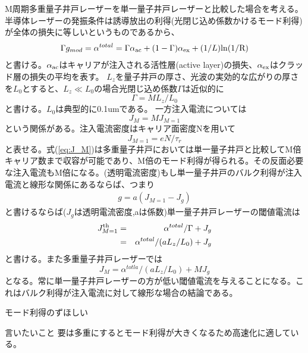 M周期多重量子井戸レーザーを単一量子井戸レーザーと比較した場合を考える。
半導体レーザーの発振条件は誘導放出の利得(光閉じ込め係数かけるモード利得)が全体の損失に等しいというものであるから、
\begin{eqnarray}
\Gamma g_{mod}=\alpha^{total}= \Gamma \alpha_{\rm{ac}} +(1-\Gamma)\alpha_{\rm{ex}}+(1/L)\rm{ln}(1/R)
\end{eqnarray}
と書ける。$\alpha_{\rm{ac}}$はキャリアが注入される活性層(active layer)の損失、$\alpha_{\rm{ex}}$はクラッド層の損失の平均を表す。
$L_{z}$を量子井戸の厚さ、光波の実効的な広がりの厚さを$L_{0}$とすると、$L_{z}\ll L_{0}$の場合光閉じ込め係数$\Gamma$は近似的に
\begin{equation}
\Gamma = ML_{z}/L_{0}
\label{eq:Gamma}
\end{equation}
と書ける。$L_{0}$は典型的に0.1umである。
一方注入電流については
\begin{equation}
J_{M}=MJ_{M=1}
\label{eq:J_M}
\end{equation}
という関係がある。注入電流密度はキャリア面密度Nを用いて
\begin{equation}
J_{M=1}=eN/\tau_{r}
\end{equation}
と表せる。式(\ref{eq:J_M})は多重量子井戸においては単一量子井戸と比較してM倍キャリア数まで収容が可能であり、M倍のモード利得が得られる。その反面必要な注入電流もM倍になる。(透明電流密度)もし単一量子井戸のバルク利得が注入電流と線形な関係にあるならば、つまり
\begin{eqnarray}
g=a(J_{M=1}-J_{g})
\end{eqnarray}
と書けるならば($J_{g}$は透明電流密度,aは係数)単一量子井戸レーザーの閾値電流は
\begin{eqnarray}
J^{\rm{th}}_{M=1}&=&\alpha^{total}/ \Gamma + J_{g}\nonumber\\
&=&\alpha^{total}/(aL_{z}/L_{0})+J_{g} 
\end{eqnarray}
と書ける。また多重量子井戸レーザーでは
\begin{equation}
J_{M}=\alpha^{totla}/(aL_{z}/L_{0}) + MJ_{g}
\end{equation}
となる。常に単一量子井戸レーザーの方が低い閾値電流を与えることになる。これはバルク利得が注入電流に対して線形な場合の結論である。


モード利得のずほしい


言いたいこと
要は多重にするとモード利得が大きくなるため高速化に適している。


